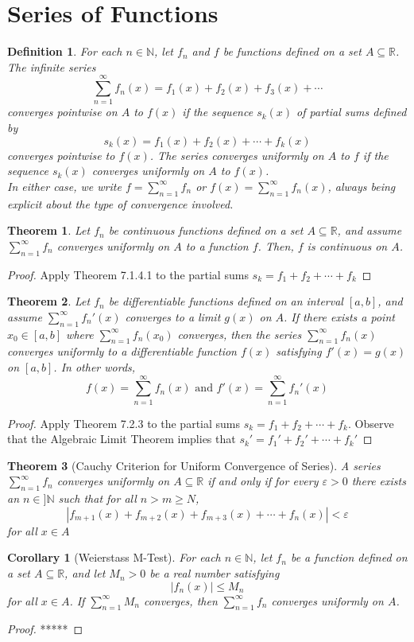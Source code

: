 \documentclass[10pt]{report}
\newtheorem{thm2}{Theorem}[section]
\newtheorem{cor2}{Corollary}[section]
\newtheorem{def2}{Definition}[section]
\newcommand{\eps}{\varepsilon}
\begin{document}
\section{Series of Functions}
\begin{def2}For each $n\in\mathbb{N}$, let $f_n$ and $f$ be functions defined on a set $A\subseteq\mathbb{R}$. The infinite series
$$\sum_{n=1}^\infty f_n(x)=f_1(x)+f_2(x)+f_3(x)+\cdots$$
converges pointwise on $A$ to $f(x)$ if the sequence $s_k(x)$ of partial sums defined by 
$$s_k(x) = f_1(x) + f_2(x) + \cdots + f_k(x)$$
converges pointwise to $f(x)$. The series converges uniformly on $A$ to $f$ if the sequence $s_k(x)$ converges uniformly on $A$ to $f(x)$.\\
In either case, we write $f=\sum_{n=1}^\infty f_n$ or $f(x)=\sum_{n=1}^\infty f_n(x)$, always being explicit about the type of convergence involved.
\end{def2}
\begin{thm2}
Let $f_n$ be continuous functions defined on a set $A\subseteq\mathbb{R}$, and assume $\sum_{n=1}^\infty f_n$ converges uniformly on $A$ to a function $f$. Then, $f$ is continuous on $A$.
\end{thm2}
\begin{proof}
Apply Theorem 7.1.4.1 to the partial sums $s_k = f_1 + f_2 + \cdots +f_k$
\end{proof}
\begin{thm2}
Let $f_n$ be differentiable functions defined on an interval $[a,b]$, and assume $\sum_{n=1}^\infty f_n'(x)$ converges to a limit $g(x)$ on $A$. If there exists a point $x_0\in [a,b]$ where $\sum_{n=1}^\infty f_n(x_0)$ converges, then the series $\sum_{n=1}^\infty f_n(x)$ converges uniformly to a differentiable function $f(x)$ satisfying $f'(x)=g(x)$ on $[a,b]$. In other words, 
$$f(x) = \sum_{n=1}^\infty f_n(x)\text{  and  } f'(x) = \sum_{n=1}^\infty f_n'(x)$$
\end{thm2}
\begin{proof}
Apply Theorem 7.2.3 to the partial sums $s_k = f_1 + f_2 + \cdots + f_k$. Observe that the Algebraic Limit Theorem implies that $s_k' = f_1' + f_2' + \cdots + f_k'$
\end{proof}
\begin{thm2}[Cauchy Criterion for Uniform Convergence of Series]
A series $\sum_{n=1}^\infty f_n$ converges uniformly on $A\subseteq \mathbb{R}$ if and only if for every $\eps >0$ there exists an $n\in]\mathbb{N}$ such that for all $n>m\geq N$,
$$|f_{m+1}(x) + f_{m+2}(x) + f_{m+3}(x) + \cdots + f_n(x)|<\eps$$
for all $x\in A$
\end{thm2}
\begin{cor2}[Weierstass M-Test]
For each $n\in\mathbb{N}$, let $f_n$ be a function defined on a set $A\subseteq\mathbb{R}$, and let $M_n>0$ be a real number satisfying
$$|f_n(x)|\leq M_n$$
for all $x\in A$. If $\sum_{n=1}^\infty M_n$ converges, then $\sum_{n=1}^\infty f_n$ converges uniformly on $A$.
\end{cor2}
\begin{proof}
*****
\end{proof}
\end{document}
